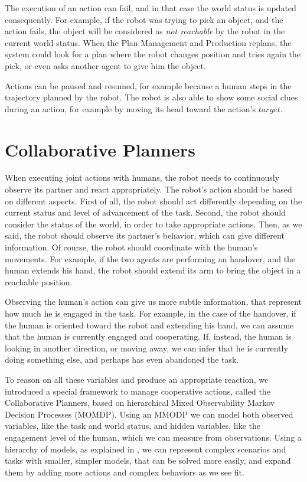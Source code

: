 The execution of an action can fail, and in that case the world status is updated consequently. For example, if the robot was trying to pick an object, and the action fails, the object will be considered as \textit{not reachable} by the robot in the current world status. When the Plan Management and Production replans, the system could look for a plan where the robot changes position and tries again the pick, or even asks another agent to give him the object.

Actions can be paused and resumed, for example because a human steps in the trajectory planned by the robot. The robot is also able to show some social clues during an action, for example by moving its head toward the action's $target$. 

\section{Collaborative Planners} 
\label{sec:plan_execution-collaborative_planners}
When executing joint actions with humans, the robot needs to continuously observe its partner and react appropriately. The robot's action should be based on different aspects. First of all, the robot should act differently depending on the current status and level of advancement of the task. Second, the robot should consider the status of the world, in order to take appropriate actions. Then, as we said, the robot should observe its partner's behavior, which can give different information. Of course, the robot should coordinate with the human's movements. For example, if the two agents are performing an handover, and the human extends his hand, the robot should extend its arm to bring the object in a reachable position.

Observing the human's action can give us more subtle information, that represent how much he is engaged in the task. For example, in the case of the handover, if the human is oriented toward the robot and extending his hand, we can assume that the human is currently engaged and cooperating. If, instead, the human is looking in another direction, or moving away, we can infer that he is currently doing something else, and perhaps has even abandoned the task.

To reason on all these variables and produce an appropriate reaction, we introduced a special framework to manage cooperative actions, called the Collaborative Planners, based on hierarchical Mixed Observability Markov Decision Processes (MOMDP). Using an MMODP we can model both observed variables, like the task and world status, and hidden variables, like the engagement level of the human, which we can measure from observations. Using a hierarchy of models, as explained in \cite{pineau2001hierarchical}, we can represent complex scenarios and tasks with smaller, simpler models, that can be solved more easily, and expand them by adding more actions and complex behaviors as we see fit.

